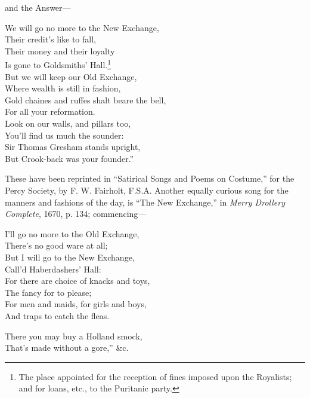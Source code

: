 
\noindent and the Answer—


\begin{dcverse}\begin{altverse}
We will go no more to the New Exchange,\\
Their credit’s like to fall,\\
Their money and their loyalty\\
Is gone to Goldsmiths’ Hall.\footnote{\textit{}
The place appointed for the reception of fines imposed
upon the Royalists; and for loans, etc., to the Puritanic
party.}\\
But we will keep our Old Exchange,\\
Where wealth is still in fashion,\\
Gold chaines and ruffes shalt beare the bell,\\
For all your reformation.\\
Look on our walls, and pillars too,\\
You’ll find us much the sounder:\\
Sir Thomas Gresham stands upright,\\
But Crook-back was your founder.”
\end{altverse}
\end{dcverse}


These have been reprinted in “Satirical Songs and Poems on Costume,” for the
Percy Society, by F. W. Fairholt, F.S.A. \pagebreak Another equally curious song for the
manners and fashions of the day, is “The New Exchange,” in \textit{Merry Drollery
Complete}, 1670, p. 134; commencing—

\normalsize
{}

\settowidth{\versewidth}{I'll go no more to the Old Exchange,}
\begin{dcverse}\begin{altverse}
I'll go no more to the Old Exchange,\\
There's no good ware at all;\\
But I will go to the New Exchange,\\
Call’d Haberdashers’ Hall:\\
For there are choice of knacks and toys,\\
The fancy for to please;\\
For men and maids, for girls and boys,\\
And traps to catch the fleas.
\end{altverse}

\begin{altverse}
There you may buy a Holland smock,\\
That’s made without a gore,” \&c.
\end{altverse}
\end{dcverse}



\pagebreak